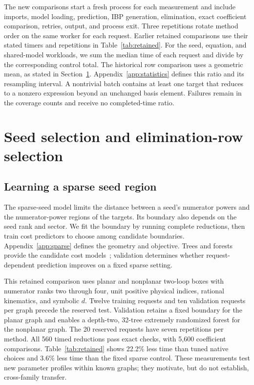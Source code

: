 \documentclass[11pt,a4paper]{article}
\begin{document}
The new comparisons start a fresh process for each measurement and include imports, model loading, prediction, IBP generation, elimination, exact coefficient comparison, retries, output, and process exit. Three repetitions rotate method order on the same worker for each request. Earlier retained comparisons use their stated timers and repetitions in Table~\ref{tab:retained}. For the seed, equation, and shared-model workloads, we sum the median time of each request and divide by the corresponding control total. The historical row comparison uses a geometric mean, as stated in Section~\ref{sec:seed-row}. Appendix~\ref{app:statistics} defines this ratio and its resampling interval. A nontrivial batch contains at least one target that reduces to a nonzero expression beyond an unchanged basis element. Failures remain in the coverage counts and receive no completed-time ratio.

\section{Seed selection and elimination-row selection}
\label{sec:seed-row}
\subsection{Learning a sparse seed region}
The sparse-seed model limits the distance between a seed's numerator powers and the numerator-power regions of the targets. Its boundary also depends on the seed rank and sector. We fit the boundary by running complete reductions, then train cost predictors to choose among candidate boundaries. Appendix~\ref{app:sparse} defines the geometry and objective. Trees and forests provide the candidate cost models~\cite{CART1984,Breiman2001Forest,Geurts2006ExtraTrees}; validation determines whether request-dependent prediction improves on a fixed sparse setting.

This retained comparison uses planar and nonplanar two-loop boxes with numerator ranks two through four, unit positive physical indices, rational kinematics, and symbolic $d$. Twelve training requests and ten validation requests per graph precede the reserved test. Validation retains a fixed boundary for the planar graph and enables a depth-two, 32-tree extremely randomized forest for the nonplanar graph. The 20 reserved requests have seven repetitions per method. All 560 timed reductions pass exact checks, with 5,600 coefficient comparisons. Table~\ref{tab:retained} shows 22.2\% less time than tuned native choices and 3.6\% less time than the fixed sparse control. These measurements test new parameter profiles within known graphs; they motivate, but do not establish, cross-family transfer.
\end{document}
